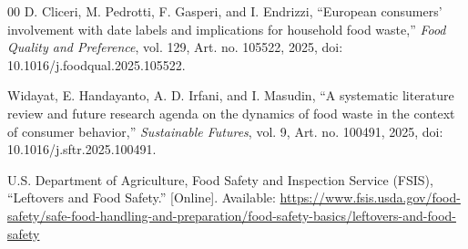 \begin{thebibliography}{00}
 D. Cliceri, M. Pedrotti, F. Gasperi, and I. Endrizzi, ``European consumers' involvement with date labels and implications for household food waste,'' \textit{Food Quality and Preference}, vol. 129, Art. no. 105522, 2025, doi: 10.1016/j.foodqual.2025.105522.

 Widayat, E. Handayanto, A. D. Irfani, and I. Masudin, ``A systematic literature review and future research agenda on the dynamics of food waste in the context of consumer behavior,'' \textit{Sustainable Futures}, vol. 9, Art. no. 100491, 2025, doi: 10.1016/j.sftr.2025.100491.

 U.S. Department of Agriculture, Food Safety and Inspection Service (FSIS), ``Leftovers and Food Safety.'' [Online]. Available: \url{https://www.fsis.usda.gov/food-safety/safe-food-handling-and-preparation/food-safety-basics/leftovers-and-food-safety}

\end{thebibliography}
